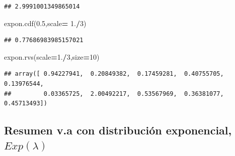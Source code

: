 \documentclass[]{book}
\newenvironment{Shaded}{\begin{snugshade}}{\end{snugshade}}
\newcommand{\DecValTok}[1]{\textcolor[rgb]{0.00,0.00,0.81}{#1}}
\newcommand{\FloatTok}[1]{\textcolor[rgb]{0.00,0.00,0.81}{#1}}
\newcommand{\NormalTok}[1]{#1}
\newcommand{\OperatorTok}[1]{\textcolor[rgb]{0.81,0.36,0.00}{\textbf{#1}}}
\begin{document}
\begin{verbatim}
## 2.9991001349865014
\end{verbatim}

\begin{Shaded}
\begin{Highlighting}[]
\NormalTok{expon.cdf(}\FloatTok{0.5}\NormalTok{,scale}\OperatorTok{=} \FloatTok{1.}\OperatorTok{/}\DecValTok{3}\NormalTok{) }
\end{Highlighting}
\end{Shaded}

\begin{verbatim}
## 0.77686983985157021
\end{verbatim}

\begin{Shaded}
\begin{Highlighting}[]
\NormalTok{expon.rvs(scale}\OperatorTok{=}\FloatTok{1.}\OperatorTok{/}\DecValTok{3}\NormalTok{,size}\OperatorTok{=}\DecValTok{10}\NormalTok{)}
\end{Highlighting}
\end{Shaded}

\begin{verbatim}
## array([ 0.94227941,  0.20849382,  0.17459281,  0.40755705,  0.13976544,
##         0.03365725,  2.00492217,  0.53567969,  0.36381077,  0.45713493])
\end{verbatim}

\hypertarget{resumen-v.a-con-distribuciuxf3n-exponencial-explambda}{%
\subsection{\texorpdfstring{Resumen v.a con distribución exponencial, \(Exp(\lambda)\)}{Resumen v.a con distribución exponencial, Exp(\textbackslash{}lambda)}}\label{resumen-v.a-con-distribuciuxf3n-exponencial-explambda}}
\end{document}
